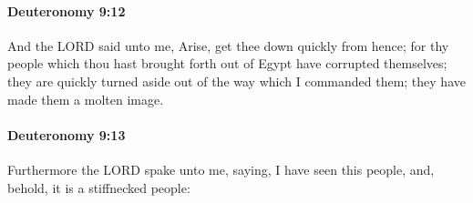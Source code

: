 		\paragraph{Deuteronomy 9:12} %
			\label{DEUTERONOMY-9-12}

			And the LORD said unto me, Arise, get thee down quickly from hence; for thy people which thou hast brought forth out of Egypt have corrupted themselves; they are quickly turned aside out of the way which I commanded them; they have made them a molten image.


		\paragraph{Deuteronomy 9:13} %
			\label{DEUTERONOMY-9-13}

			Furthermore the LORD spake unto me, saying, I have seen this people, and, behold, it is a stiffnecked people:

